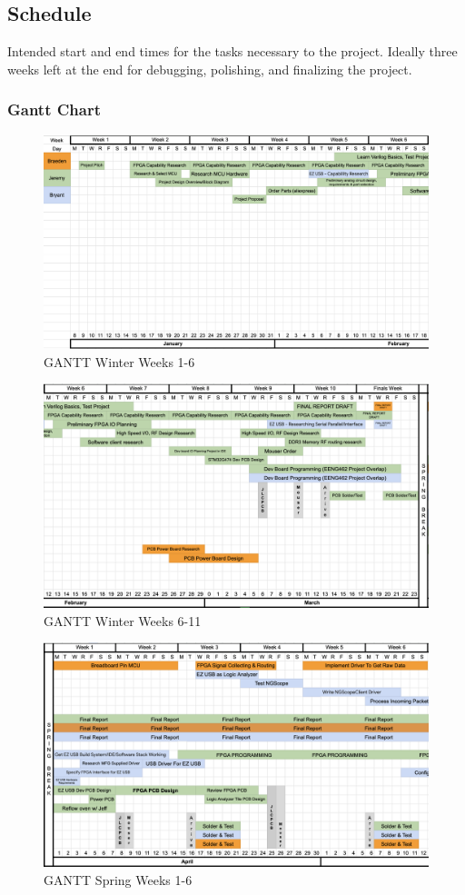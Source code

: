 \subsection{Schedule}
	Intended start and end times for the tasks necessary to the project. Ideally three weeks left at the end for debugging, polishing, and finalizing the project.
	\subsubsection{Gantt Chart}
			\begin{figure}[H]
				\centering
				\includegraphics[width=0.8\linewidth]{images/GANTT1.png}
				\caption{GANTT Winter Weeks 1-6}
				\label{fig:gantt1}
				\vspace{15px}
			\end{figure}
			\begin{figure}[H]
				\centering
				\includegraphics[width=0.8\linewidth]{images/GANTT2.png}
				\caption{GANTT Winter Weeks 6-11}
				\label{fig:gantt2t}
				\vspace{15px}
			\end{figure}
			\begin{figure}[H]
				\centering
				\includegraphics[width=0.8\linewidth]{images/GANTT3.png}
				\caption{GANTT Spring Weeks 1-6}
				\label{fig:gantt3}
				\vspace{15px}
			\end{figure}
